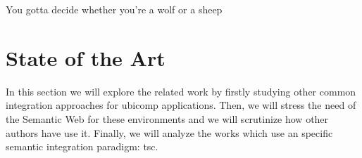 

\begin{savequote}[50mm]
You gotta decide whether you’re a wolf or a sheep
%
\end{savequote}


\chapter{State of the Art}
\label{cha:stateoftheart}

\ifpdf
    \graphicspath{{2_state_of_the_art/figures/PNG/}{2_state_of_the_art/figures/PDF/}{2_state_of_the_art/figures/}}
\else
    \graphicspath{{2_state_of_the_art/figures/EPS/}{2_state_of_the_art/figures/}}
\fi




In this section we will explore the related work by firstly studying other common integration approaches for \ac{ubicomp} applications.
Then, we will stress the need of the Semantic Web for these environments and we will scrutinize how other authors have use it.
Finally, we will analyze the works which use an specific semantic integration paradigm: \acl{tsc}.











